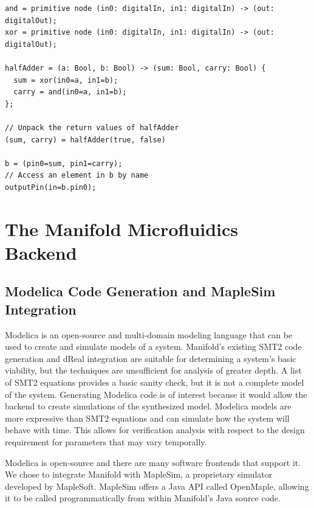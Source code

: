 \begin{lstlisting}[label=lst:unpacking, caption=Examples of new tuple features]
and = primitive node (in0: digitalIn, in1: digitalIn) -> (out: digitalOut);
xor = primitive node (in0: digitalIn, in1: digitalIn) -> (out: digitalOut);

halfAdder = (a: Bool, b: Bool) -> (sum: Bool, carry: Bool) {
  sum = xor(in0=a, in1=b);
  carry = and(in0=a, in1=b);
};

// Unpack the return values of halfAdder
(sum, carry) = halfAdder(true, false)

b = (pin0=sum, pin1=carry);
// Access an element in b by name
outputPin(in=b.pin0);
\end{lstlisting}

\section{The Manifold Microfluidics Backend}

\subsection{Modelica Code Generation and MapleSim Integration}

Modelica is an open-source and multi-domain modeling language that can be used
to create and simulate models of a system.
Manifold's existing SMT2 code generation and dReal integration are suitable for
determining a system's basic viability, but the techniques are unsufficient for
analysis of greater depth.
A list of SMT2 equations provides a basic sanity check, but it is not a complete model of the system.
Generating Modelica code is of interest because it would allow the backend to create simulations of the synthesized model.
Modelica models are more expressive than SMT2 equations and can simulate how the system will behave with time. 
This allows for verification analysis
with respect to the design requirement for parameters that may vary temporally. %

Modelica is open-source and there are many software frontends that support it.
We chose to integrate Manifold with MapleSim, a proprietary simulator developed by MapleSoft.
MapleSim offers a Java API called OpenMaple, allowing it to be called programmatically from within Manifold's Java source code.

